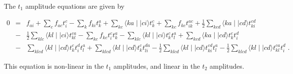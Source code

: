 \documentclass[aps,prc,twocolumn,floatfix]{revtex4}
\begin{document}
The $t_1$ amplitude equations are given by
\begin{widetext}
\begin{eqnarray}
0 & = & f_{ai} + \sum_cf_{ac}t^c_i - \sum_k f_{ki}t^a_k +  
\sum_{kc}\langle ka\mid\mid ci\rangle t^c_k + \sum_{kc}f_{kc}t^{ac}_{ik}
+\frac{1}{2}\sum_{kcd}\langle ka\mid\mid cd\rangle t^{cd}_{ki} \nonumber \\
  & - & \frac{1}{2}\sum_{klc}\langle kl\mid\mid ci \rangle t^{ca}_{kl}
-\sum_{kc}f_{kc}t^c_it^a_k -\sum_{klc}\langle kl\mid\mid ci\rangle t^c_k t^a_l
+\sum_{kcd} \langle ka\mid\mid cd \rangle t^c_k t^d_i  \nonumber \\
  & - & \sum_{klcd}\langle kl\mid\mid cd\rangle t^c_kt^d_it^a_l
+ \sum_{klcd}\langle kl\mid\mid cd\rangle t^c_kt^{da}_{li}
- \frac{1}{2} \sum_{klcd}\langle kl\mid\mid cd\rangle t^{cd}_{ki}t^{a}_{l}
- \frac{1}{2} \sum_{klcd}\langle kl\mid\mid cd\rangle t^{ca}_{kl}t^{d}_{i}\;.
\label{t1_eqn}
\end{eqnarray}
\end{widetext}
This equation is non-linear in the $t_1$ amplitudes, and linear in
the $t_2$ amplitudes. 
\end{document}
